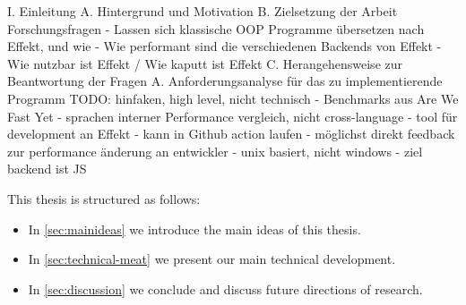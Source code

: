 I. Einleitung
	A. Hintergrund und Motivation
	B. Zielsetzung der Arbeit
		Forschungsfragen
		- Lassen sich klassische OOP Programme übersetzen nach Effekt, und wie
		- Wie performant sind die verschiedenen Backends von Effekt
		- Wie nutzbar ist Effekt / Wie kaputt ist Effekt
	C. Herangehensweise zur Beantwortung der Fragen
	A. Anforderungsanalyse für das zu implementierende Programm
		TODO: hinfaken, high level, nicht technisch
		- Benchmarks aus Are We Fast Yet
		- sprachen interner Performance vergleich, nicht cross-language
		- tool für development an Effekt
		- kann in Github action laufen 
		- möglichst direkt feedback zur performance änderung an entwickler
		- unix basiert, nicht windows
		- ziel backend ist JS

\medskip
This thesis is structured as follows:
\begin{itemize}
    \item In \cref{sec:mainideas} we introduce the main ideas of this thesis.
    \item In \cref{sec:technical-meat} we present our main technical development.
    \item In \cref{sec:discussion} we conclude and discuss future directions of research.
\end{itemize}

